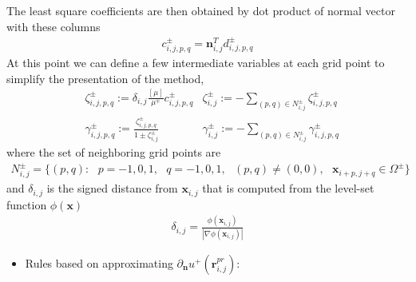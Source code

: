 \documentclass{elsarticle}
\begin{document}
The least square coefficients are then obtained by dot product of normal vector with these columns 
\begin{align*}
c^\pm_{i,j,p,q} = \mathbf{n}_{i,j}^T  d^\pm_{i,j,p,q}
\end{align*}
At this point we can define a few intermediate variables at each grid point to simplify the presentation of the method,
\begin{align*}
&\zeta_{i,j,p,q}^\pm := \delta_{i,j} \frac{[\mu]}{\mu^\mp}c_{i,j,p,q}^\pm     & \zeta_{i,j}^\pm := -\sum_{(p,q)\in N_{i,j}^\pm} \zeta_{i,j,p,q}^\pm \\
&\gamma_{i,j,p,q}^\pm := \frac{\zeta_{i,j,p,q}^\pm}{1 \pm \zeta^\pm_{i,j}}   & \gamma^\pm_{i,j} := -\sum_{(p,q)\in N_{i,j}^\pm} \gamma_{i,j,p,q}^\pm
\end{align*}
where the set of neighboring grid points are 
\begin{align*}
N_{i,j}^\pm = \{(p,q) :\ \ \  p=-1,0,1, \ \ \  q=-1,0,1, \ \ \ (p,q)\neq (0,0), \ \ \ \mathbf{x}_{i+p,j+q}\in \Omega^\pm \}
\end{align*}
and $\delta_{i,j}$ is the signed distance from $\mathbf{x}_{i,j}$ that is computed from the level-set function $\phi(\mathbf{x})$
\begin{align*}
\delta_{i,j}=\frac{\phi(\mathbf{x}_{i,j})}{|\nabla \phi(\mathbf{x}_{i,j})|}
\end{align*}

\begin{itemize}
\item Rules based on approximating $\partial_\mathbf{n}u^+(\mathbf{r}^{pr}_{i,j})$:
\end{itemize}
\end{document}
